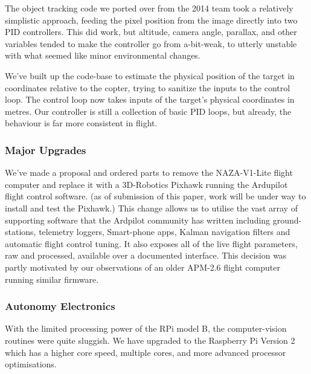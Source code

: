 \documentclass[a4paper, 11pt, titlepage]{article}
\begin{document}
      The object tracking code we ported over from the 2014 team took a relatively simplistic approach, feeding the pixel position from the image directly into two PID controllers.  This did work, but altitude, camera angle, parallax, and other variables tended to make the controller go from a-bit-weak, to utterly unstable with what seemed like minor environmental changes.

      We've built up the code-base to estimate the physical position of the target in coordinates relative to the copter, trying to sanitize the inputs to the control loop. The control loop now takes inputs of the target's physical coordinates in metres.  Our controller is still a collection of basic PID loops, but already, the behaviour is far more consistent in flight.

    \subsubsection{Major Upgrades}
      We've made a proposal and ordered parts to remove the NAZA-V1-Lite flight computer and replace it with a 3D-Robotics Pixhawk \cite{3dr-pixhawk} running the Ardupilot flight control software.  (as of submission of this paper, work will be under way to install and test the Pixhawk.)
      This change allows us to utilise the vast array of supporting software that the Ardpilot community has written including ground-stations, telemetry loggers, Smart-phone apps, Kalman navigation filters and automatic flight control tuning.  It also exposes all of the live flight parameters, raw and processed, available over a documented interface.  This decision was partly motivated by our observations of an older APM-2.6 flight computer running similar firmware.

    \subsubsection{Autonomy Electronics}
      With the limited processing power of the RPi model B, the computer-vision routines were quite sluggish.  We have upgraded to the Raspberry Pi Version 2 which has a higher core speed, multiple cores, and more advanced processor optimisations.
\end{document}

